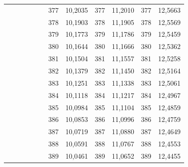 \documentclass[a4paper,12pt]{article} %
\begin{document}
\begin{longtable}[c]{cccccccccc|c|c|}
	&  &  &  &  & \multicolumn{1}{c|}{} & \multicolumn{1}{c|}{377} & \multicolumn{1}{c|}{10,2035} & \multicolumn{1}{c|}{377} & 11,2010 & 377 & 12,5663 \\ \cline{7-12} 
	&  &  &  &  & \multicolumn{1}{c|}{} & \multicolumn{1}{c|}{378} & \multicolumn{1}{c|}{10,1903} & \multicolumn{1}{c|}{378} & 11,1905 & 378 & 12,5569 \\ \cline{7-12} 
	&  &  &  &  & \multicolumn{1}{c|}{} & \multicolumn{1}{c|}{379} & \multicolumn{1}{c|}{10,1773} & \multicolumn{1}{c|}{379} & 11,1786 & 379 & 12,5459 \\ \cline{7-12} 
	&  &  &  &  & \multicolumn{1}{c|}{} & \multicolumn{1}{c|}{380} & \multicolumn{1}{c|}{10,1644} & \multicolumn{1}{c|}{380} & 11,1666 & 380 & 12,5362 \\ \cline{7-12} 
	&  &  &  &  & \multicolumn{1}{c|}{} & \multicolumn{1}{c|}{381} & \multicolumn{1}{c|}{10,1504} & \multicolumn{1}{c|}{381} & 11,1557 & 381 & 12,5258 \\ \cline{7-12} 
	&  &  &  &  & \multicolumn{1}{c|}{} & \multicolumn{1}{c|}{382} & \multicolumn{1}{c|}{10,1379} & \multicolumn{1}{c|}{382} & 11,1450 & 382 & 12,5164 \\ \cline{7-12} 
	&  &  &  &  & \multicolumn{1}{c|}{} & \multicolumn{1}{c|}{383} & \multicolumn{1}{c|}{10,1251} & \multicolumn{1}{c|}{383} & 11,1338 & 383 & 12,5061 \\ \cline{7-12} 
	&  &  &  &  & \multicolumn{1}{c|}{} & \multicolumn{1}{c|}{384} & \multicolumn{1}{c|}{10,1118} & \multicolumn{1}{c|}{384} & 11,1217 & 384 & 12,4967 \\ \cline{7-12} 
	&  &  &  &  & \multicolumn{1}{c|}{} & \multicolumn{1}{c|}{385} & \multicolumn{1}{c|}{10,0984} & \multicolumn{1}{c|}{385} & 11,1104 & 385 & 12,4859 \\ \cline{7-12} 
	&  &  &  &  & \multicolumn{1}{c|}{} & \multicolumn{1}{c|}{386} & \multicolumn{1}{c|}{10,0853} & \multicolumn{1}{c|}{386} & 11,0996 & 386 & 12,4759 \\ \cline{7-12} 
	&  &  &  &  & \multicolumn{1}{c|}{} & \multicolumn{1}{c|}{387} & \multicolumn{1}{c|}{10,0719} & \multicolumn{1}{c|}{387} & 11,0880 & 387 & 12,4649 \\ \cline{7-12} 
	&  &  &  &  & \multicolumn{1}{c|}{} & \multicolumn{1}{c|}{388} & \multicolumn{1}{c|}{10,0591} & \multicolumn{1}{c|}{388} & 11,0767 & 388 & 12,4553 \\ \cline{7-12} 
	&  &  &  &  & \multicolumn{1}{c|}{} & \multicolumn{1}{c|}{389} & \multicolumn{1}{c|}{10,0461} & \multicolumn{1}{c|}{389} & 11,0652 & 389 & 12,4455 \\ \cline{7-12} 

\end{longtable}
\end{document}
